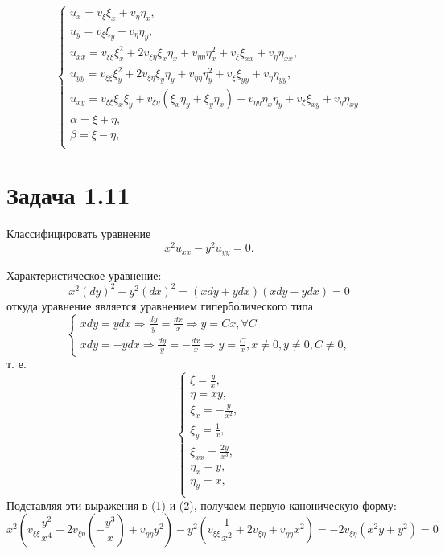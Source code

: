 \documentclass[11pt]{article}
\author{Sergey Makarov}
\date{\today}
\title{}
\def\zall{\setcounter{lem}{0}\setcounter{cnsqnc}{0}\setcounter{th}{0}\setcounter{Cmt}{0}\setcounter{equation}{0}}
\begin{document}
\zall

\begin{equation}
\begin{cases}
u_x = v_{\xi}\xi_x + v_{\eta}\eta_x, \\
u_y = v_{\xi}\xi_y + v_{\eta}\eta_y, \\
u_{xx} = v_{\xi\xi}\xi_x^2 + 2v_{\xi\eta}\xi_x\eta_x + v_{\eta\eta}\eta_x^2 + v_{\xi}\xi_{xx} + v_{\eta}\eta_{xx}, \\
u_{yy} = v_{\xi\xi}\xi_y^2 + 2v_{\xi\eta}\xi_y\eta_y + v_{\eta\eta}\eta_y^2 + v_{\xi}\xi_{yy} + v_{\eta}\eta_{yy}, \\
u_{xy} = v_{\xi\xi}\xi_x\xi_y + v_{\xi\eta}(\xi_x\eta_y + \xi_y\eta_x) + v_{\eta\eta}\eta_x\eta_y
+ v_{\xi}\xi_{xy} + v_{\eta}\eta_{xy} \\
\alpha = \xi + \eta, \\
\beta = \xi - \eta, \\
\end{cases}
\end{equation}

\section{Задача 1.11}
\label{sec:orgd9c1a73}
Классифицировать уравнение
\begin{equation}
x^2u_{xx} - y^2u_{yy} = 0.
\end{equation}

Характеристическое уравнение:
\begin{equation}
x^2(dy)^2 - y^2(dx)^2 = (xdy + ydx)(xdy - ydx) = 0
\end{equation}
откуда уравнение является уравнением гиперболического типа
\begin{equation*}
\begin{cases}
xdy = ydx \Rightarrow \frac{dy}y = \frac{dx}x \Rightarrow y = Cx, \forall C \\
xdy = -ydx \Rightarrow \frac{dy}y = -\frac{dx}x \Rightarrow y = \frac{C}x, x \neq 0, y \neq 0, C \neq 0,
\end{cases}
\end{equation*}
т. е.
\begin{equation*}
\begin{cases}
\xi = \frac{y}x, \\
\eta = xy, \\
\xi_x = -\frac{y}{x^2}, \\
\xi_y = \frac1x, \\
\xi_{xx} = \frac{2y}{x^3}, \\
\eta_x = y, \\
\eta_y = x, \\
\end{cases}
\end{equation*}
Подставляя эти выражения в (1) и (2), получаем первую каноническую форму:
\begin{equation}
x^2\left(v_{\xi\xi}\frac{y^2}{x^4} + 2v_{\xi\eta}\left(-\frac{y^3}x\right) + v_{\eta\eta}y^2\right) -
y^2\left(v_{\xi\xi}\frac1{x^2} + 2v_{\xi\eta} + v_{\eta\eta}x^2\right) = -2v_{\xi\eta}(x^2y + y^2) = 0
\end{equation}
\end{document}
